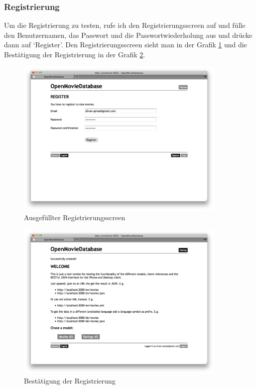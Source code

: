 \subsubsection{Registrierung}
Um die Registrierung zu testen, rufe ich den Registrierungsscreen auf und fülle
den Benutzernamen, das Passwort und die Passwortwiederholung aus und drücke dann auf
`Register'. Den Registrierungsscreen sieht man in der Grafik \ref{test_registrierung_01}
und die Bestätigung der Registrierung in der Grafik \ref{test_registrierung_02}.

\begin{figure}[ht]
    \begin{center}
        \includegraphics[width=0.9\textwidth,angle=0]{./bilder/tests/test_registrierung_01.png}
        \caption{Ausgefüllter Registrierungsscreen}
        \label{test_registrierung_01}
    \end{center}
\end{figure}

\begin{figure}[ht]
    \begin{center}
        \includegraphics[width=0.9\textwidth,angle=0]{./bilder/tests/test_registrierung_02.png}
        \caption{Bestätigung der Registrierung}
        \label{test_registrierung_02}
    \end{center}
\end{figure}

